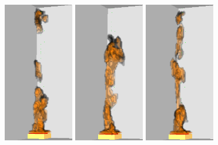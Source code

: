 \documentclass[twoside]{uocthesis}
\begin{document}
{\begin{figure}[p]
	\includegraphics[width=1.2in]{../Figures/FDSNG_Corner7}
	\includegraphics[width=1.2in]{../Figures/FDSNG_Corner8}
	\includegraphics[width=1.2in]{../Figures/FDSNG_Corner9} \\
	


\end{figure}}
\end{document}
